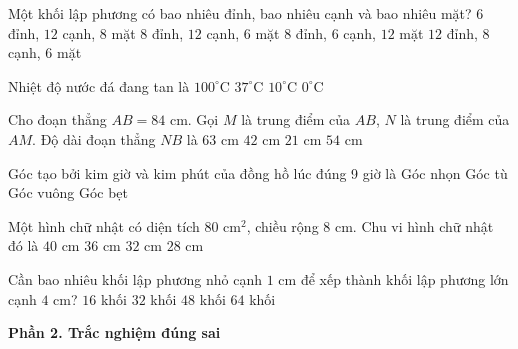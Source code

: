 \begin{ex} %
Một khối lập phương có bao nhiêu đỉnh, bao nhiêu cạnh và bao nhiêu mặt?
\choice
{$6$ đỉnh, $12$ cạnh, $8$ mặt}
{\True $8$ đỉnh, $12$ cạnh, $6$ mặt}
{$8$ đỉnh, $6$ cạnh, $12$ mặt}
{$12$ đỉnh, $8$ cạnh, $6$ mặt}
\end{ex}

\begin{ex} %
Nhiệt độ nước đá đang tan là
\choice
{$100^\circ\text{C}$}
{$37^\circ\text{C}$}
{$10^\circ\text{C}$}
{\True $0^\circ\text{C}$}
\end{ex}

\begin{ex} %
Cho đoạn thẳng $AB = 84\text{ cm}$. Gọi $M$ là trung điểm của $AB$, $N$ là trung điểm của $AM$. Độ dài đoạn thẳng $NB$ là
\choice
{\True $63\text{ cm}$}
{$42\text{ cm}$}
{$21\text{ cm}$}
{$54\text{ cm}$}
\end{ex}

\begin{ex} %
Góc tạo bởi kim giờ và kim phút của đồng hồ lúc đúng 9 giờ là
\choice
{Góc nhọn}
{Góc tù}
{\True Góc vuông}
{Góc bẹt}
\end{ex}

\begin{ex} %
Một hình chữ nhật có diện tích $80\text{ cm}^2$, chiều rộng $8\text{ cm}$. Chu vi hình chữ nhật đó là
\choice
{$40\text{ cm}$}
{\True $36\text{ cm}$}
{$32\text{ cm}$}
{$28\text{ cm}$}
\end{ex}

\begin{ex} %
Cần bao nhiêu khối lập phương nhỏ cạnh $1\text{ cm}$ để xếp thành khối lập phương lớn cạnh $4\text{ cm}$?
\choice
{$16$ khối}
{$32$ khối}
{$48$ khối}
{\True $64$ khối}
\end{ex}

\textbf{Phần 2. Trắc nghiệm đúng sai}

